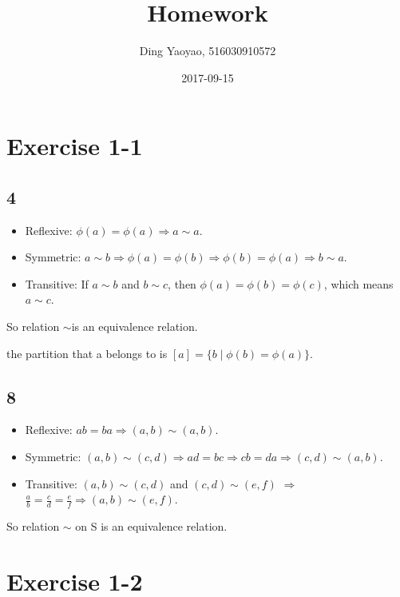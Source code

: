 \documentclass{article}
\title{Homework}
\date{2017-09-15}
\author{Ding Yaoyao, 516030910572}
\begin{document}
	\maketitle

	\section*{Exercise 1-1}

		\subsection*{4}

		\begin{itemize}
				\item Reflexive: $\phi(a) = \phi(a) \Rightarrow a \sim a$.

				\item Symmetric: $a \sim b \Rightarrow \phi(a) = \phi(b) \Rightarrow \phi(b) = \phi(a) \Rightarrow b \sim a$.

				\item Transitive: If $a \sim b $ and $b \sim c$, then $\phi(a) = \phi(b) = \phi(c)$, which means $a \sim c$.
		\end{itemize}

		So relation $\sim$is an equivalence relation.

		the partition that a belongs to is $[a] = \{ b \mid \phi(b) = \phi(a) \}$.

		\subsection*{8}

		\begin{itemize}
				\item Reflexive: $ab=ba \Rightarrow (a,b) \sim (a,b)$.

				\item Symmetric: $(a,b) \sim (c,d) \Rightarrow ad=bc \Rightarrow cb = da \Rightarrow (c,d) \sim (a,b)$.

				\item Transitive: $(a,b) \sim (c,d)$ and $(c,d) \sim (e,f)$ $\Rightarrow$ $\frac{a}{b} = \frac{c}{d} = \frac{e}{f} \Rightarrow (a,b) \sim (e,f)$.
		\end{itemize}

		So relation $\sim$ on S is an equivalence relation.

	\section*{Exercise 1-2}
\end{document}
